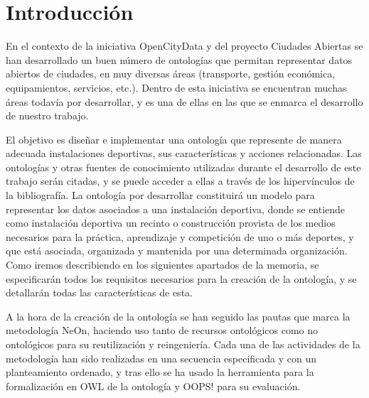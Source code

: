 \documentclass[a4paper,12pt]{article}
\begin{document}
	
	\setlength{\parindent}{0.5cm}
	\setlength{\voffset}{-2cm}
	\setlength{\hoffset}{-2cm}
	
	
	
	\tableofcontents
	
\newpage

	\section{Introducción}
		
	En el contexto de la iniciativa OpenCityData \cite{opencitydata} y del proyecto
Ciudades Abiertas \cite{ciudadesabiertas} se han desarrollado un buen número de
ontologías que permitan representar datos abiertos de ciudades, en muy diversas áreas (transporte,
gestión económica, equipamientos, servicios, etc.). Dentro de esta iniciativa se encuentran
muchas áreas todavía por desarrollar, y es una de ellas en las que se enmarca el desarrollo de
nuestro trabajo.
	
	El objetivo es diseñar e implementar una ontología que represente de manera adecuada
instalaciones deportivas, sus características y acciones relacionadas. Las ontologías y otras
fuentes de conocimiento utilizadas durante el desarrollo de este trabajo serán citadas, y se puede
acceder a ellas a través de los hipervínculos de la bibliografía.
La ontología por desarrollar constituirá un modelo para representar los datos asociados a una
instalación deportiva, donde se entiende como instalación deportiva un recinto o construcción provista de los medios necesarios para la práctica, aprendizaje y competición de uno o más
deportes, y que está asociada, organizada y mantenida por una determinada organización. Como
iremos describiendo en los siguientes apartados de la memoria, se especificarán todos los
requisitos necesarios para la creación de la ontología, y se detallarán todas las características de
esta.
	
	A la hora de la creación de la ontología se han seguido las pautas que marca la metodología NeOn,
haciendo uso tanto de recursos ontológicos como no ontológicos para su reutilización y
reingeniería. Cada una de las actividades de la metodología han sido realizadas en una secuencia
especificada y con un planteamiento ordenado, y tras ello se ha usado la herramienta  para
la formalización en OWL de la ontología y OOPS! para su evaluación.
	
\end{document}
